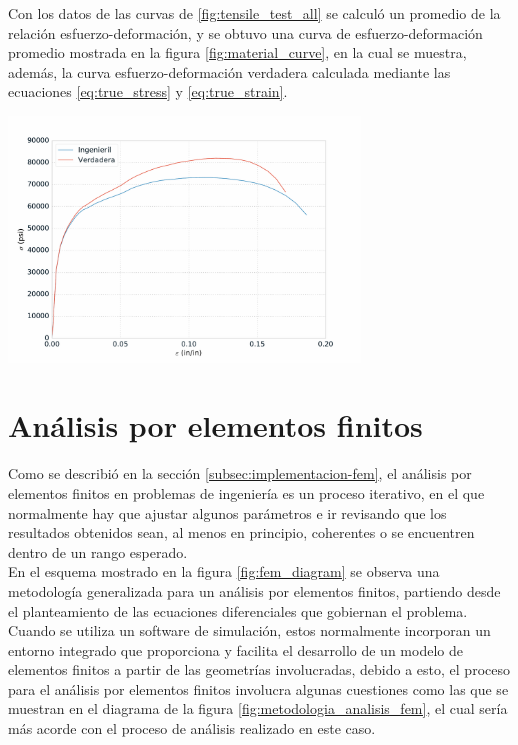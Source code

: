Con los datos de las curvas de \ref{fig:tensile_test_all} se calculó un promedio de la relación esfuerzo-deformación, 
y se obtuvo una curva de esfuerzo-deformación promedio mostrada en la figura \ref{fig:material_curve}, 
en la cual se muestra, además, la curva esfuerzo-deformación verdadera calculada mediante las ecuaciones 
\ref{eq:true_stress} y \ref{eq:true_strain}.

\begin{center}
\includegraphics[width=0.7\textwidth]{src/ch3/material_curve.pdf}
\label{fig:material_curve}
\end{center}

\section{Análisis por elementos finitos}

Como se describió en la sección \ref{subsec:implementacion-fem}, el análisis por elementos 
finitos en problemas de ingeniería es un proceso iterativo, en el que normalmente hay que ajustar 
algunos parámetros e ir revisando que los resultados obtenidos sean, al menos en principio, 
coherentes o se encuentren dentro de un rango esperado. \\

En el esquema mostrado en la figura \ref{fig:fem_diagram} se observa una metodología generalizada 
para un análisis por elementos finitos, partiendo desde el planteamiento de las 
ecuaciones diferenciales que gobiernan el problema. Cuando se utiliza un software 
de simulación, estos normalmente incorporan un entorno integrado que 
proporciona y facilita el desarrollo de un modelo de elementos finitos a partir 
de las geometrías involucradas, debido a esto, el proceso para el análisis por elementos 
finitos involucra algunas cuestiones como las que se muestran en el diagrama de 
la figura \ref{fig:metodologia_analisis_fem}, el cual sería más acorde con 
el proceso de análisis realizado en este caso.

